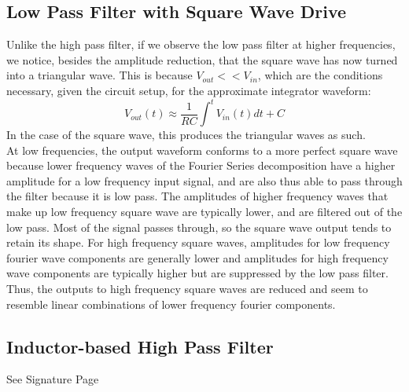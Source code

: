 \documentclass{article}
\begin{document}
\subsection{Low Pass Filter with Square Wave Drive}
    Unlike the high pass filter, if we observe the low pass filter at higher frequencies, we notice, besides the amplitude reduction, that the square wave has now turned into a triangular wave\cite{artelectronics}. This is because $V_{out} << V_{in}$, which are the conditions necessary, given the circuit setup, for the approximate integrator waveform\cite{artelectronics}:
    \begin{equation}
        V_{out}(t) \approx \frac{1}{RC}\int^t V_{in}(t)dt + C
    \end{equation}
    In the case of the square wave, this produces the triangular waves as such. \\ 
    \indent At low frequencies, the output waveform conforms to a more perfect square wave because lower frequency waves of the Fourier Series decomposition have a higher amplitude for a low frequency input signal, and are also thus able to pass through the filter because it is low pass. The amplitudes of higher frequency waves that make up low frequency square wave are typically lower, and are filtered out of the low pass. Most of the signal passes through, so the square wave output tends to retain its shape. For high frequency square waves, amplitudes for low frequency fourier wave components are generally lower and amplitudes for high frequency wave components are typically higher but are suppressed by the low pass filter. Thus, the outputs to high frequency square waves are reduced and seem to resemble linear combinations of lower frequency fourier components.



\subsection{Inductor-based High Pass Filter}
    See Signature Page
\end{document}
